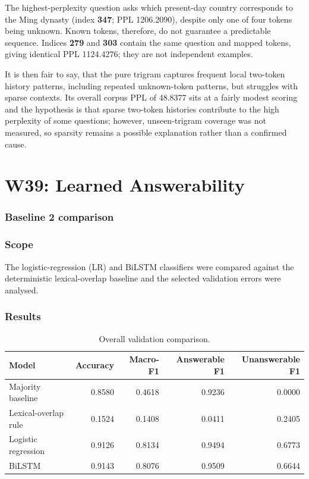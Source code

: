 \documentclass[11pt]{article}
\begin{document}
\noindent
The highest-perplexity question asks which present-day country corresponds to the Ming dynasty (index \textbf{347}; PPL 1206.2090), despite only one of four tokens being unknown. Known tokens, therefore, do not guarantee a predictable sequence. Indices \textbf{279} and \textbf{303} contain the same question and mapped tokens, giving identical PPL 1124.4276; they are not independent examples.

\noindent
It is then fair to say, that the pure trigram captures frequent local two-token history patterns, including repeated unknown-token patterns, but struggles with sparse contexts. Its overall corpus PPL of 48.8377 sits at a fairly modest scoring and the hypothesis is that sparse two-token histories contribute to the high perplexity of some questions; however, unseen-trigram coverage was not measured, so sparsity remains a possible explanation rather than a confirmed cause.

\section{W39: Learned Answerability}

\subsubsection*{Baseline 2 comparison}

\subsubsection*{Scope}

\noindent
The logistic-regression (LR) and BiLSTM classifiers were compared against the deterministic lexical-overlap baseline and the selected validation errors were analysed.

\subsubsection*{Results}

\begin{table}[!h]
    \centering
    \small
    \begin{tabular}{lrrrr}
        \toprule
        Model & Accuracy & Macro-F1 & Answerable F1 & Unanswerable F1 \\
        \midrule
        Majority baseline & 0.8580 & 0.4618 & 0.9236 & 0.0000 \\
        Lexical-overlap rule & 0.1524 & 0.1408 & 0.0411 & 0.2405 \\
        Logistic regression & 0.9126 & 0.8134 & 0.9494 & 0.6773 \\
        BiLSTM & 0.9143 & 0.8076 & 0.9509 & 0.6644 \\
        \bottomrule
    \end{tabular}
    \caption{Overall validation comparison.}
    \label{table:week_39_baseline_comparison}
\end{table}
\end{document}
